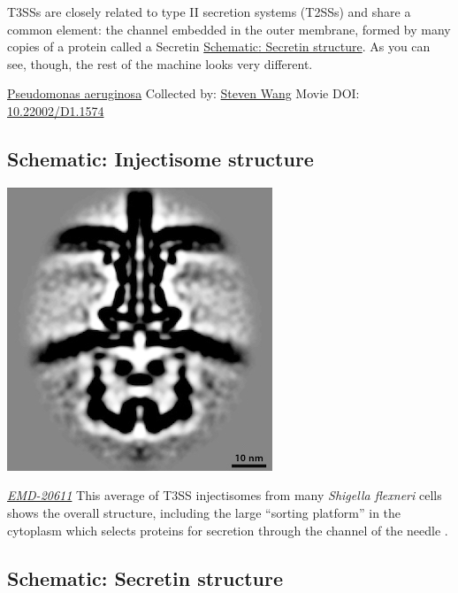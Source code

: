 \documentclass[]{tufte-book}
\begin{document}
T3SSs are closely related to type II secretion systems (T2SSs) and share a common element: the channel embedded in the outer membrane, formed by many copies of a protein called a Secretin \protect\hyperlink{Secretin_structure}{Schematic: Secretin structure}. As you can see, though, the rest of the machine looks very different.



\hypertarget{htmlwidget-d39e28218b462b43ab95}{}

\label{fig:9-4}\protect\hyperlink{tree}{Pseudomonas aeruginosa} Collected by: \protect\hyperlink{steven_wang}{Steven Wang} Movie DOI: \href{https://doi.org/10.22002/D1.1574}{10.22002/D1.1574}

\hypertarget{Injectisome_structure}{%
\subsection*{Schematic: Injectisome structure}\label{Injectisome_structure}}

\includegraphics{img/schematics/9_4_1}

\href{https://www.ebi.ac.uk/pdbe/entry/emdb/EMD-20611}{\emph{EMD-20611}}
This average of T3SS injectisomes from many \emph{Shigella flexneri} cells shows the overall structure, including the large ``sorting platform'' in the cytoplasm which selects proteins for secretion through the channel of the needle \citep{tachiyama2019}.

\hypertarget{Secretin_structure}{%
\subsection*{Schematic: Secretin structure}\label{Secretin_structure}}
\end{document}
